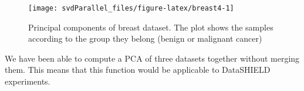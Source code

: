 \documentclass[]{article}
\newenvironment{Shaded}{\begin{snugshade}}{\end{snugshade}}
\newcommand{\KeywordTok}[1]{\textcolor[rgb]{0.13,0.29,0.53}{\textbf{#1}}}
\newcommand{\DataTypeTok}[1]{\textcolor[rgb]{0.13,0.29,0.53}{#1}}
\newcommand{\DecValTok}[1]{\textcolor[rgb]{0.00,0.00,0.81}{#1}}
\newcommand{\FloatTok}[1]{\textcolor[rgb]{0.00,0.00,0.81}{#1}}
\newcommand{\StringTok}[1]{\textcolor[rgb]{0.31,0.60,0.02}{#1}}
\newcommand{\OperatorTok}[1]{\textcolor[rgb]{0.81,0.36,0.00}{\textbf{#1}}}
\newcommand{\NormalTok}[1]{#1}
\begin{document}
\begin{Shaded}
\end{Shaded}

\begin{figure}

{\centering \texttt{[image: svdParallel\_files/figure-latex/breast4-1]} 

}

\caption{Principal components of breast dataset. The plot shows the samples according to the group they belong (benign or malignant cancer)}\label{fig:breast4}
\end{figure}

We have been able to compute a PCA of three datasets together without
merging them. This means that this function would be applicable to
DataSHIELD experiments.
\end{document}
